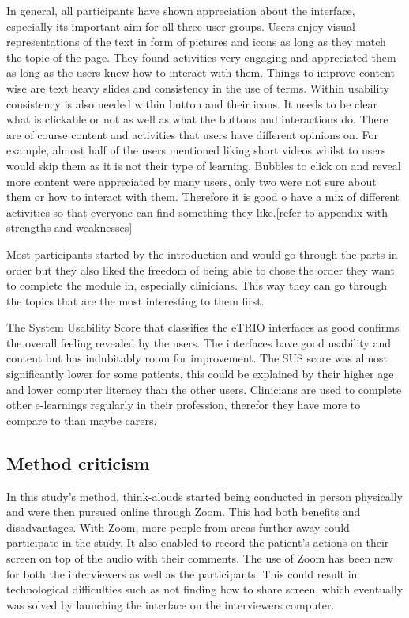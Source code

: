 \documentclass{sigchi}
\begin{document}
In general, all participants have shown appreciation about the interface, especially its important aim for all three user groups. Users enjoy visual representations of the text in form of pictures and icons as long as they match the topic of the page. They found activities very engaging and appreciated them as long as the users knew how to interact with them. Things to improve content wise are text heavy slides and consistency in the use of terms. Within usability consistency is also needed within button and their icons. It needs to be clear what is clickable or not as well as what the buttons and interactions do. There are of course content and activities that users have different opinions on. For example, almost half of the users mentioned liking short videos whilst to users would skip them as it is not their type of learning. Bubbles to click on and reveal more content were appreciated by many users, only two were not sure about them or how to interact with them. Therefore it is good o have a mix of different activities so that everyone can find something they like.[refer to appendix with strengths and weaknesses]

Most participants started by the introduction and would go through the parts in order but they also liked the freedom of being able to chose the order they want to complete the module in, especially clinicians. This way they can go through the topics that are the most interesting to them first. 

The System Usability Score that classifies the eTRIO interfaces as good confirms the overall feeling revealed by the users. The interfaces have good usability and content but has indubitably room for improvement. The SUS score was almost significantly lower for some patients, this could be explained by their higher age and lower computer literacy than the other users. Clinicians are used to complete other e-learnings regularly in their profession, therefor they have more to compare to than maybe carers.

\subsection{Method criticism}
In this study's method, think-alouds started being conducted in person physically and were then pursued online through Zoom. This had both benefits and disadvantages. With Zoom, more people from areas further away could participate in the study. It also enabled to record the patient's actions on their screen on top of the audio with their comments. The use of Zoom has been new for both the interviewers as well as the participants. This could result in technological difficulties such as not finding how to share screen, which eventually was solved by launching the interface on the interviewers computer. 
\end{document}
